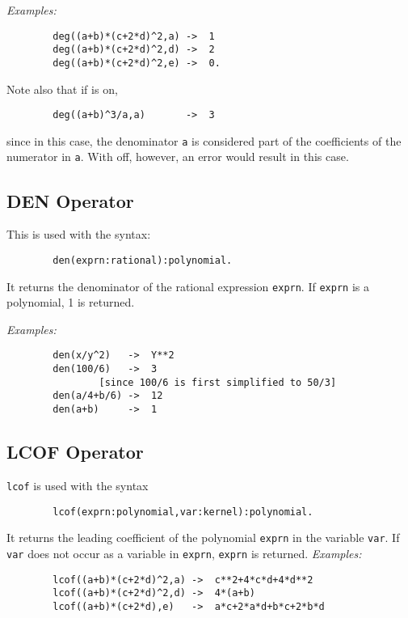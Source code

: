 \textit{Examples:}
\begin{verbatim}
        deg((a+b)*(c+2*d)^2,a) ->  1
        deg((a+b)*(c+2*d)^2,d) ->  2
        deg((a+b)*(c+2*d)^2,e) ->  0.
\end{verbatim}
Note also that if  is on,
\begin{verbatim}
        deg((a+b)^3/a,a)       ->  3
\end{verbatim}
since in this case, the denominator \texttt{a} is considered part of the
coefficients of the numerator in \texttt{a}.  With  off, however,
an error would result in this case.

\subsection{DEN Operator}
\hypertarget{operator:DEN}{}

This is used with the syntax:
\begin{verbatim}
        den(exprn:rational):polynomial.
\end{verbatim}
It returns the denominator of the rational expression \texttt{exprn}.  If
\texttt{exprn} is a polynomial, 1 is returned.

\textit{Examples:}
\begin{verbatim}
        den(x/y^2)   ->  Y**2
        den(100/6)   ->  3
                [since 100/6 is first simplified to 50/3]
        den(a/4+b/6) ->  12
        den(a+b)     ->  1
\end{verbatim}

\subsection{LCOF Operator}
\hypertarget{operator:LCOF}{}

\texttt{lcof} is used with the syntax
\begin{verbatim}
        lcof(exprn:polynomial,var:kernel):polynomial.
\end{verbatim}
It returns the leading coefficient of the
polynomial \texttt{exprn} in the variable \texttt{var}.  If \texttt{var} does not
occur as a variable in \texttt{exprn}, \texttt{exprn} is returned.
\textit{Examples:}
\begin{verbatim}
        lcof((a+b)*(c+2*d)^2,a) ->  c**2+4*c*d+4*d**2
        lcof((a+b)*(c+2*d)^2,d) ->  4*(a+b)
        lcof((a+b)*(c+2*d),e)   ->  a*c+2*a*d+b*c+2*b*d
\end{verbatim}

